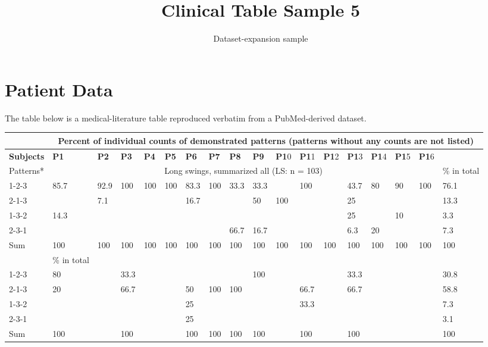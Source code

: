 \documentclass[11pt]{article}
\title{Clinical Table Sample 5}
\author{Dataset-expansion sample}
\date{}
\begin{document}
\maketitle
\section{Patient Data}
The table below is a medical-literature table reproduced verbatim from a PubMed-derived dataset.

\begin{table}
\begin{tabular}{|l|l|l|l|l|l|l|l|l|l|l|l|l|l|l|l|l|l|}
\hline
 & \multicolumn{17}{c|}{\textbf{Percent of individual counts of demonstrated patterns (patterns without any counts are not listed)}} \\
\hline
\textbf{Subjects} & \textbf{P1} & \textbf{P2} & \textbf{P3} & \textbf{P4} & \textbf{P5} & \textbf{P6} & \textbf{P7} & \textbf{P8} & \textbf{P9} & \textbf{P1}0 & \textbf{P1}1 & \textbf{P1}2 & \textbf{P1}3 & \textbf{P1}4 & \textbf{P1}5 & \textbf{P1}6 \\
\hline
Patterns* & \multicolumn{16}{c|}{Long swings, summarized all (LS: n = 103)} & \% in total \\
\hline
1-2-3 & 85.7 & 92.9 & 100 & 100 & 100 & 83.3 & 100 & 33.3 & 33.3 &  & 100 &  & 43.7 & 80 & 90 & 100 & 76.1 \\
\hline
2-1-3 &  & 7.1 &  &  &  & 16.7 &  &  & 50 & 100 &  &  & 25 &  &  &  & 13.3 \\
\hline
1-3-2 & 14.3 &  &  &  &  &  &  &  &  &  &  &  & 25 &  & 10 &  & 3.3 \\
\hline
2-3-1 &  &  &  &  &  &  &  & 66.7 & 16.7 &  &  &  & 6.3 & 20 &  &  & 7.3 \\
\hline
\multirow{2}{*}{Sum} & 100 & 100 & 100 & 100 & 100 & 100 & 100 & 100 & 100 & 100 & 100 & 100 & 100 & 100 & 100 & 100 & 100 \\
\hline
\multicolumn{16}{c|}{Near axis swings, summarized all (NAS: n = 31)} & \% in total \\
\hline
1-2-3 & 80 &  & 33.3 &  &  &  &  &  & 100 &  &  &  & 33.3 &  &  &  & 30.8 \\
\hline
2-1-3 & 20 &  & 66.7 &  &  & 50 & 100 & 100 &  &  & 66.7 &  & 66.7 &  &  &  & 58.8 \\
\hline
1-3-2 &  &  &  &  &  & 25 &  &  &  &  & 33.3 &  &  &  &  &  & 7.3 \\
\hline
2-3-1 &  &  &  &  &  & 25 &  &  &  &  &  &  &  &  &  &  & 3.1 \\
\hline
\multirow{2}{*}{Sum} & 100 &  & 100 &  &  & 100 & 100 & 100 & 100 &  & 100 &  & 100 &  &  &  & 100 \\

\end{tabular}
\end{table}
\end{document}

